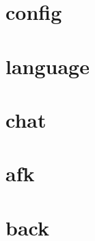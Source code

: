 \clearpage
\section{config}


\clearpage
\section{language}


\clearpage
\section{chat}

























\clearpage
\section{afk}


\clearpage
\section{back}

